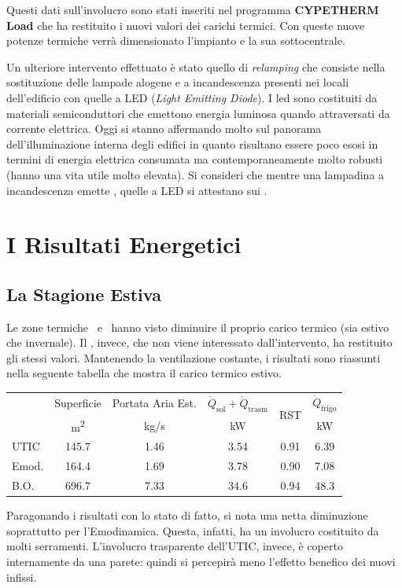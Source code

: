 Questi dati sull'involucro sono stati inseriti nel programma \textbf{CYPETHERM Load} che ha restituito i nuovi valori dei carichi termici. Con queste nuove potenze termiche verrà dimensionato l'impianto e la sua sottocentrale.

Un ulteriore intervento effettuato è stato quello di \emph{relamping} che consiste nella sostituzione delle lampade alogene e a incandescenza presenti nei locali dell'edificio con quelle a LED (\emph{Light Emitting Diode}). I led sono costituiti da materiali semiconduttori che emettono energia luminosa quando attraversati da corrente elettrica. Oggi si stanno affermando molto sul panorama dell'illuminazione interna degli edifici in quanto risultano essere poco esosi in termini di energia elettrica consumata ma contemporaneamente molto robusti (hanno una vita utile molto elevata). Si consideri che mentre una lampadina a incandescenza emette , quelle a LED si attestano sui .
\section{I Risultati Energetici}
\subsection{La Stagione Estiva}
Le zone termiche \utic\ e \emod\ hanno visto diminuire il proprio carico termico (sia estivo che invernale). Il \blocc, invece, che non viene interessato dall'intervento, ha restituito gli stessi valori. Mantenendo la ventilazione costante, i risultati sono riassunti nella seguente tabella che mostra il carico termico estivo.
\begin{center}
	\begin{tabular}{lccccc}
		\toprule
		&	Superficie 				&	Portata Aria Est. 			&	$\dot{Q}_{\mathrm{sol}}+\dot{Q}_{\mathrm{trasm}}$		& 	\multirow{2}{*}{RST}		&	$\dot{Q}_{\mathrm{frigo}}$ 	\\
		&	{\small \si{m^2}}		&		{\small \si{kg/s}}		&		{\small \si{kW}}				&								&{\small \si{kW}}		\\					
		\midrule	
		UTIC		&		\num{145.7}			&		\num{1.46}				&	\num{3.54}		&	\num{0.91}					&	\num{6.39}		\\
		Emod.		&		\num{164.4}			&		\num{1.69}				&	\num{3.78}		&	\num{0.90}					&	\num{7.08}		\\
		B.O.		&		\num{696.7}			&		\num{7.33}				&	\num{34.6}		&	\num{0.94}					&	\num{48.3}		\\
		\bottomrule
	\end{tabular}
\end{center}
Paragonando i risultati con lo stato di fatto, si nota una netta diminuzione soprattutto per l'Emodinamica. Questa, infatti, ha un involucro costituito da molti serramenti. L'involucro trasparente dell'UTIC, invece, è coperto internamente da una parete: quindi si percepirà meno l'effetto benefico dei nuovi infissi.

